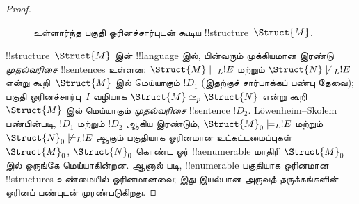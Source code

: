 \documentclass[../../../include/open-logic-section]{subfiles}
\begin{document}
\begin{proof}
\begin{figure}[h]
  \centering
  \caption{உள்ளார்ந்த பகுதி ஓரினச்சார்புடன் கூடிய
    !!{structure}~$\Struct{M}$.}
\end{figure}

!!{structure}~$\Struct{M}$ இன் !!{language} இல், பின்வரும்
முக்கியமான இரண்டு \emph{முதல்வரிசை} !!{sentence}s உள்ளன:
$\Struct{M} \models_L !E$ மற்றும் $\Struct{N} \not\models_L !E$
என்று கூறி~$\Struct{M}$ இல் மெய்யாகும் $!D_1$ (இதற்குச்
சார்பாக்கப் பண்பு தேவை); பகுதி ஓரினச்சார்பு~$I$ வழியாக
$\Struct{M} \simeq_p \Struct{N}$ என்று கூறி~$\Struct{M}$ இல்
மெய்யாகும் \emph{முதல்வரிசை} !!{sentence} $!D_2$.
L\"owenheim--Skolem பண்பின்படி, $!D_1$ மற்றும் $!D_2$ ஆகிய இரண்டும்,
$\Struct{M}_0 \models_L !E$ மற்றும் $\Struct{N}_0
\not\models_L !E$ ஆகும் பகுதியாக ஓரினமான உட்கட்டமைப்புகள்
$\Struct{M}_0$, $\Struct{N}_0$ கொண்ட ஓர் !!a{enumerable} மாதிரி
$\Struct{M}_0$ இல் ஒருங்கே மெய்யாகின்றன. ஆனால்
 படி, !!{enumerable} பகுதியாக ஓரினமான
!!{structure}s உண்மையில் ஓரினமானவை; இது இயல்பான அருவத் தருக்கங்களின்
ஓரினப் பண்புடன் முரண்படுகிறது.
\end{proof}
\end{document}
